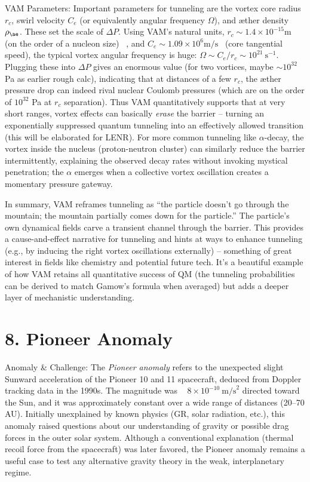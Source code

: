 \documentclass[a4paper, aps,preprint,superscriptaddress, 12pt]{revtex4}
\begin{document}
VAM Parameters: Important parameters for tunneling are the vortex core radius $r_c$, swirl velocity $C_e$ (or equivalently angular frequency $\Omega$), and æther density $\rho_{\ae}$. These set the scale of $\Delta P$. Using VAM’s natural units, $r_c\sim1.4\times10^{-15}\text{m}$ (on the order of a nucleon size)~\cite{VAM_constants} , and $C_e\sim1.09\times10^6\text{m/s}$~\cite{VAM_constants}  (core tangential speed), the typical vortex angular frequency is huge: $\Omega \sim C_e/r_c \sim 10^{21}~\text{s}^{-1}$. Plugging these into $\Delta P$ gives an enormous value (for two vortices, maybe $\sim10^{32}$ Pa as earlier rough calc), indicating that at distances of a few $r_c$, the æther pressure drop can indeed rival nuclear Coulomb pressures (which are on the order of $10^{32}$ Pa at $r_c$ separation). Thus VAM quantitatively supports that at very short ranges, vortex effects can basically \textit{erase} the barrier – turning an exponentially suppressed quantum tunneling into an effectively allowed transition (this will be elaborated for LENR). For more common tunneling like $\alpha$-decay, the vortex inside the nucleus (proton-neutron cluster) can similarly reduce the barrier intermittently, explaining the observed decay rates without invoking mystical penetration; the $\alpha$ emerges when a collective vortex oscillation creates a momentary pressure gateway.


In summary, VAM reframes tunneling as “the particle doesn’t go through the mountain; the mountain partially comes down for the particle.” The particle’s own dynamical fields carve a transient channel through the barrier. This provides a cause-and-effect narrative for tunneling and hints at ways to enhance tunneling (e.g., by inducing the right vortex oscillations externally) – something of great interest in fields like chemistry and potential future tech. It’s a beautiful example of how VAM retains all quantitative success of QM (the tunneling probabilities can be derived to match Gamow’s formula when averaged) but adds a deeper layer of mechanistic understanding.


\section*{8. Pioneer Anomaly}

Anomaly \& Challenge: The \textit{Pioneer anomaly} refers to the unexpected slight Sunward acceleration of the Pioneer 10 and 11 spacecraft, deduced from Doppler tracking data in the 1990s. The magnitude was ~ $8\times10^{-10}~\text{m/s}^2$ directed toward the Sun, and it was approximately constant over a wide range of distances (20–70 AU). Initially unexplained by known physics (GR, solar radiation, etc.), this anomaly raised questions about our understanding of gravity or possible drag forces in the outer solar system. Although a conventional explanation (thermal recoil force from the spacecraft) was later favored, the Pioneer anomaly remains a useful case to test any alternative gravity theory in the weak, interplanetary regime.
\end{document}
